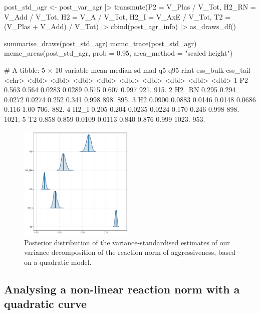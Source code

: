\documentclass[a4paper,12pt,twoside]{article}
\begin{document}
\begin{Rinput}
post_std_agr <-
    post_var_agr |>
    transmute(P2    = V_Plas / V_Tot,
              H2_RN = V_Add / V_Tot,
              H2    = V_A / V_Tot,
              H2_I  = V_AxE / V_Tot,
              T2    = (V_Plas + V_Add) / V_Tot) |>
    cbind(post_agr_info) |>
    as_draws_df()

summarise_draws(post_std_agr)
mcmc_trace(post_std_agr)
mcmc_areas(post_std_agr,
           prob = 0.95,
           area_method = "scaled height")
\end{Rinput}
\begin{Routput}
# A tibble: 5 × 10
  variable   mean median     sd    mad     q5   q95  rhat ess_bulk ess_tail
  <chr>     <dbl>  <dbl>  <dbl>  <dbl>  <dbl> <dbl> <dbl>    <dbl>    <dbl>
1 P2       0.563  0.564  0.0283 0.0289 0.515  0.607 0.997     921.     915.
2 H2_RN    0.295  0.294  0.0272 0.0274 0.252  0.341 0.998     898.     895.
3 H2       0.0900 0.0883 0.0146 0.0148 0.0686 0.116 1.00      706.     882.
4 H2_I     0.205  0.204  0.0235 0.0224 0.170  0.246 0.998     898.    1021.
5 T2       0.858  0.859  0.0109 0.0113 0.840  0.876 0.999    1023.     953.
\end{Routput}

\begin{figure}[h!t!b!]
  \includegraphics[width = 0.49\textwidth]{Aggressiveness_varstd_ds.pdf}
  \caption{Posterior distribution of the variance-standardised estimates of our variance decomposition of the reaction norm of aggressiveness, based on a quadratic model.}
  \label{fig_agr_var_decomp_ds}
\end{figure}

\subsection{Analysing a non-linear reaction norm with a quadratic curve}
\end{document}
